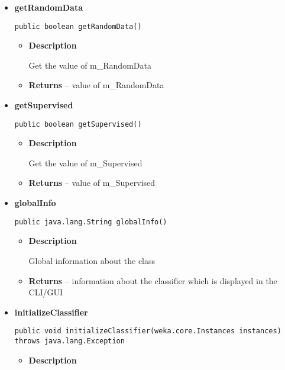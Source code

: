 \documentclass[11pt,a4paper]{report}
\begin{document}
{{{{{\begin{itemize}
{\begin{itemize}
{Gets the current settings of the Classifier.
}
\item{{\bf  Returns} -- 
an array of strings suitable for passing to setOptions 
}%
\end{itemize}
}%
\item{ 
{\bf  getRandomData}\\
\begin{lstlisting}[frame=none]
public boolean getRandomData()\end{lstlisting} %
\begin{itemize}
\item{
{\bf  Description}

Get the value of m\_RandomData
}
\item{{\bf  Returns} -- 
value of m\_RandomData 
}%
\end{itemize}
}%
\item{ 
{\bf  getSupervised}\\
\begin{lstlisting}[frame=none]
public boolean getSupervised()\end{lstlisting} %
\begin{itemize}
\item{
{\bf  Description}

Get the value of m\_Supervised
}
\item{{\bf  Returns} -- 
value of m\_Supervised 
}%
\end{itemize}
}%
\item{ 
{\bf  globalInfo}\\
\begin{lstlisting}[frame=none]
public java.lang.String globalInfo()\end{lstlisting} %
\begin{itemize}
\item{
{\bf  Description}

Global information about the class
}
\item{{\bf  Returns} -- 
information about the classifier which is displayed in the CLI/GUI 
}%
\end{itemize}
}%
\item{ 
{\bf  initializeClassifier}\\
\begin{lstlisting}[frame=none]
public void initializeClassifier(weka.core.Instances instances) throws java.lang.Exception\end{lstlisting} %
\begin{itemize}
\item{
{\bf  Description}

}
\end{itemize}}
\end{itemize}}}}}}
\end{document}
